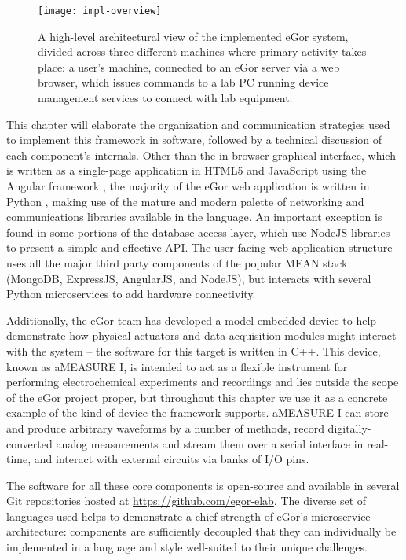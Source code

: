 \documentclass[../thesis]{subfiles}
\begin{document}
\begin{figure}
  \texttt{[image: impl-overview]}
  \caption{
    A high-level architectural view of the implemented eGor system,
    divided across three different machines where primary activity
    takes place: a user's machine, connected to an eGor server via a
    web browser, which issues commands to a lab PC running device
    management services to connect with lab equipment.
    \label{fig:ImplOverview}
  }
\end{figure}

This chapter will elaborate the organization and communication
strategies used to implement this framework in software, followed by a
technical discussion of each component's internals.  Other than the
in-browser graphical interface, which is written as a single-page
application in HTML5 and JavaScript using the Angular framework
\cite{Angular}, the majority of the eGor web application is written in
Python \cite{Python}, making use of the mature and modern palette of
networking and communications libraries available in the language. An
important exception is found in some portions of the database access
layer, which use NodeJS \cite{NodeJS} libraries to present a simple
and effective API. The user-facing web application structure uses all
the major third party components of the popular MEAN stack \cite{MEAN}
(MongoDB, ExpressJS, AngularJS, and NodeJS), but interacts with
several Python microservices to add hardware
connectivity.

Additionally, the eGor team has developed a model
embedded device to help demonstrate how physical actuators and data
acquisition modules might interact with the system -- the software for
this target is written in C++. This device, known as aMEASURE I, is intended to
act as a flexible instrument for performing electrochemical
experiments and recordings and lies outside the scope of the eGor project
proper, but throughout this chapter we use it as a concrete example of
the kind of device the framework supports. aMEASURE I can store and
produce arbitrary waveforms by a number of methods, record
digitally-converted analog measurements and stream them over a serial
interface in real-time, and interact with external circuits via banks
of I/O pins.

The software for all these core
components is open-source and available in several Git repositories
hosted at \url{https://github.com/egor-elab}. The diverse set of
languages used helps to demonstrate a chief strength of eGor's
microservice architecture: components are sufficiently decoupled that
they can individually be implemented in a language and style
well-suited to their unique challenges.
\end{document}

